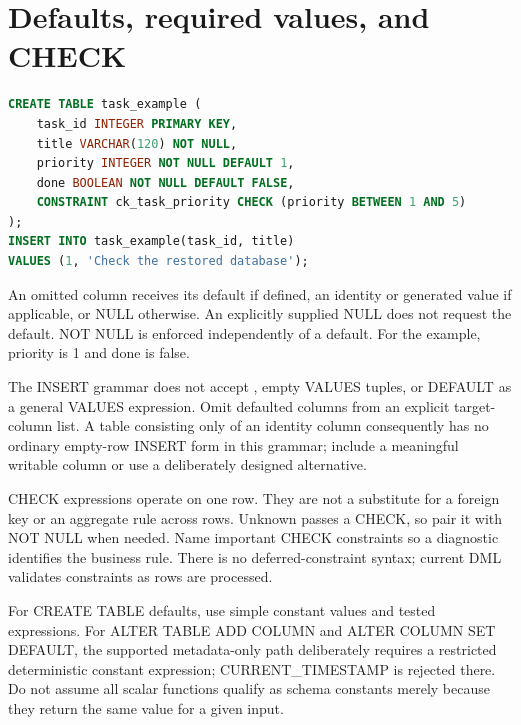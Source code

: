 \section{Defaults, required values, and CHECK}

\begin{lstlisting}[language=SQL]
CREATE TABLE task_example (
    task_id INTEGER PRIMARY KEY,
    title VARCHAR(120) NOT NULL,
    priority INTEGER NOT NULL DEFAULT 1,
    done BOOLEAN NOT NULL DEFAULT FALSE,
    CONSTRAINT ck_task_priority CHECK (priority BETWEEN 1 AND 5)
);
INSERT INTO task_example(task_id, title)
VALUES (1, 'Check the restored database');
\end{lstlisting}

An omitted column receives its default if defined, an identity or generated value if applicable, or NULL otherwise. An explicitly supplied NULL does not request the default. NOT NULL is enforced independently of a default. For the example, priority is 1 and done is false.

The INSERT grammar does not accept , empty VALUES tuples, or DEFAULT as a general VALUES expression. Omit defaulted columns from an explicit target-column list. A table consisting only of an identity column consequently has no ordinary empty-row INSERT form in this grammar; include a meaningful writable column or use a deliberately designed alternative.

CHECK expressions operate on one row. They are not a substitute for a foreign key or an aggregate rule across rows. Unknown passes a CHECK, so pair it with NOT NULL when needed. Name important CHECK constraints so a diagnostic identifies the business rule. There is no deferred-constraint syntax; current DML validates constraints as rows are processed.

For CREATE TABLE defaults, use simple constant values and tested expressions. For ALTER TABLE ADD COLUMN and ALTER COLUMN SET DEFAULT, the supported metadata-only path deliberately requires a restricted deterministic constant expression; CURRENT\_TIMESTAMP is rejected there. Do not assume all scalar functions qualify as schema constants merely because they return the same value for a given input.


